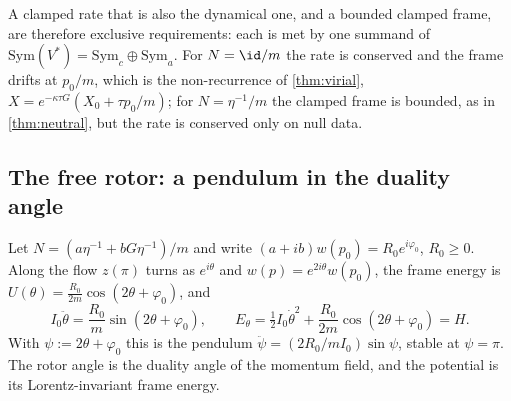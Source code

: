 A clamped rate that is also the dynamical one, and a bounded clamped frame, are therefore exclusive requirements: each is met by one summand of
$\mathrm{Sym}(V^*)=\mathrm{Sym}_c\oplus\mathrm{Sym}_a$. For $N=\id/m$ the rate is conserved and the frame drifts at $p_0/m$, which is the
non-recurrence of \cref{thm:virial}, $X=e^{-\kappa\tau G}(X_0+\tau p_0/m)$; for $N=\eta^{-1}/m$ the clamped frame is bounded, as in \cref{thm:neutral},
but the rate is conserved only on null data.

\subsection{The free rotor: a pendulum in the duality angle}

\begin{theorem}
\label{thm:pendulum}
Let $N=(a\eta^{-1}+bG\eta^{-1})/m$ and write $(a+ib)w(p_0)=R_0e^{i\varphi_0}$, $R_0\ge0$. Along the flow $z(\pi)$ turns as $e^{i\theta}$ and
$w(p)=e^{2i\theta}w(p_0)$, the frame energy is $U(\theta)=\tfrac{R_0}{2m}\cos(2\theta+\varphi_0)$, and
\[
I_0\ddot\theta=\frac{R_0}m\sin(2\theta+\varphi_0),\qquad E_\theta=\tfrac12I_0\dot\theta^2+\frac{R_0}{2m}\cos(2\theta+\varphi_0)=H .
\]
With $\psi:=2\theta+\varphi_0$ this is the pendulum $\ddot\psi=(2R_0/mI_0)\sin\psi$, stable at $\psi=\pi$. The rotor angle is the duality angle of
the momentum field, and the potential is its Lorentz-invariant frame energy.
\end{theorem}

